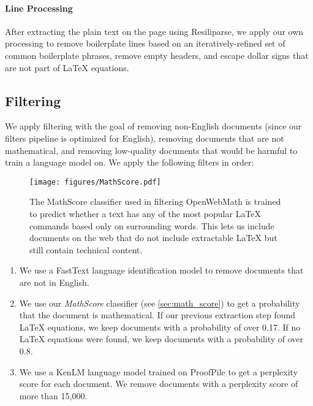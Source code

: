 \paragraph{Line Processing} After extracting the plain text on the page using Resiliparse, we apply our own processing to remove boilerplate lines based on an iteratively-refined set of common boilerplate phrases, remove empty headers, and escape dollar signs that are not part of \LaTeX{} equations.

\subsection{Filtering}
\label{sec:filtering}

We apply filtering with the goal of removing non-English documents (since our filters pipeline is optimized for English), removing documents that are not mathematical, and removing low-quality documents that would be harmful to train a language model on. We apply the following filters in order:

\begin{figure}[t!]
\begin{center}
\texttt{[image: figures/MathScore.pdf]}
\end{center}
\vspace{-1em}
\caption{The MathScore classifier used in filtering OpenWebMath is trained to predict whether a text has any of the most popular \LaTeX{} commands based only on surrounding words. This lets us include documents on the web that do not include extractable \LaTeX{} but still contain technical content.}
\vspace{-1em}
\label{fig:mathscore}
\end{figure}

\begin{enumerate}
    \item We use a FastText language identification model \citep{joulin2016fasttext} to remove documents that are not in English.
    \item We use our \textit{MathScore} classifier (see \autoref{sec:math_score}) to get a probability that the document is mathematical. If our previous extraction step found \LaTeX{} equations, we keep documents with a probability of over 0.17. If no \LaTeX{} equations were found, we keep documents with a probability of over 0.8.
    \item We use a KenLM language model \citep{heafield2011kenlm} trained on ProofPile \citep{azerbayev2023proofnet} to get a perplexity score for each document. We remove documents with a perplexity score of more than 15,000.
\end{enumerate}

